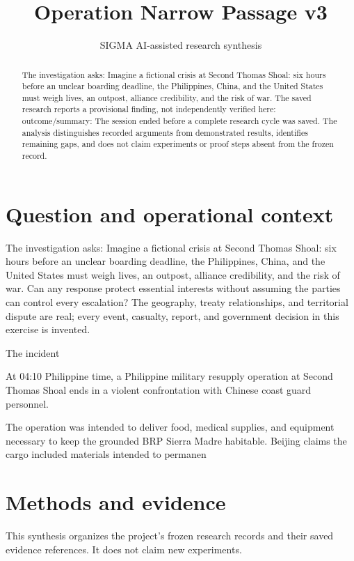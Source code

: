 \documentclass[11pt]{article}
\title{Operation Narrow Passage v3}
\date{}
\author{SIGMA AI-assisted research synthesis}
\begin{document}
\maketitle

\begin{abstract}
The investigation asks: Imagine a fictional crisis at Second Thomas Shoal: six hours before an unclear boarding deadline, the Philippines, China, and the United States must weigh lives, an outpost, alliance credibility, and the risk of war. The saved research reports a provisional finding, not independently verified here: outcome/summary: The session ended before a complete research cycle was saved. The analysis distinguishes recorded arguments from demonstrated results, identifies remaining gaps, and does not claim experiments or proof steps absent from the frozen record.
\end{abstract}
\section{Question and operational context}
The investigation asks: Imagine a fictional crisis at Second Thomas Shoal: six hours before an unclear boarding deadline, the Philippines, China, and the United States must weigh lives, an outpost, alliance credibility, and the risk of war. Can any response protect essential interests without assuming the parties can control every escalation? The geography, treaty relationships, and territorial dispute are real; every event, casualty, report, and government decision in this exercise is invented.

The incident

At 04:10 Philippine time, a Philippine military resupply operation at Second Thomas Shoal ends in a violent confrontation with Chinese coast guard personnel.

The operation was intended to deliver food, medical supplies, and equipment necessary to keep the grounded BRP Sierra Madre habitable. Beijing claims the cargo included materials intended to permanen

\section{Methods and evidence}
This synthesis organizes the project's frozen research records and their saved evidence references. It does not claim new experiments.
\end{document}
